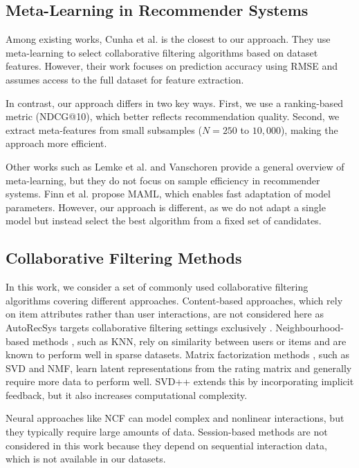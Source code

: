\documentclass[conference]{IEEEtran}
\begin{document}
\subsection{Meta-Learning in Recommender Systems}

Among existing works, Cunha et al. \cite{cunha2018metalearning} is the closest to our approach. They use meta-learning to select collaborative filtering algorithms based on dataset features. However, their work focuses on prediction accuracy using RMSE and assumes access to the full dataset for feature extraction.

In contrast, our approach differs in two key ways. First, we use a ranking-based metric (NDCG@10), which better reflects recommendation quality. Second, we extract meta-features from small subsamples ($N = 250$ to $10,000$), making the approach more efficient.

Other works such as Lemke et al. \cite{lemke2015metalearning} and Vanschoren \cite{vanschoren2018meta} provide a general overview of meta-learning, but they do not focus on sample efficiency in recommender systems. Finn et al. \cite{finn2017maml} propose MAML, which enables fast adaptation of model parameters. However, our approach is different, as we do not adapt a single model but instead select the best algorithm from a fixed set of candidates.

\subsection{Collaborative Filtering Methods}

In this work, we consider a set of commonly used collaborative filtering algorithms covering different approaches. Content-based approaches, which rely on item attributes rather than user interactions, are not considered here as AutoRecSys targets collaborative filtering settings exclusively \cite{pazzani2007content}. Neighbourhood-based methods \cite{ekstrand2011cf, linden2003amazon, sarwar2001item}, such as KNN, rely on similarity between users or items and are known to perform well in sparse datasets. Matrix factorization methods \cite{koren2008factorization, koren2009matrix}, such as SVD and NMF, learn latent representations from the rating matrix and generally require more data to perform well. SVD++ \cite{koren2008factorization} extends this by incorporating implicit feedback, but it also increases computational complexity.

Neural approaches like NCF \cite{he2017ncf} can model complex and nonlinear interactions, but they typically require large amounts of data. Session-based methods \cite{hidasi2016session} are not considered in this work because they depend on sequential interaction data, which is not available in our datasets.
\end{document}
